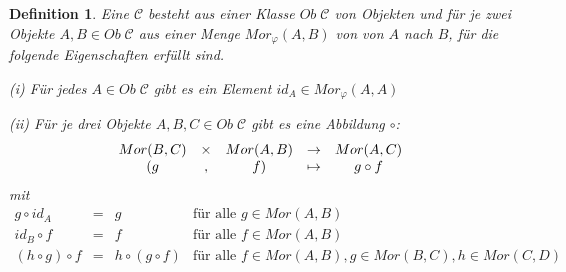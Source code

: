 \documentclass[a4paper,10pt,german]{scrbook}
\theoremstyle{saetze}
\theoremstyle{definitionen}
\newtheorem{Def}{Definition}[section]
\begin{document}
\begin{Def}
    Eine  $\mathcal{C}$ besteht aus einer Klasse $Ob
    \;\mathcal{C}$ von Objekten und für je zwei Objekte $A,B \in Ob\; \mathcal{C}$ aus 
    einer Menge $Mor_{\varphi}(A,B)$ von  von $A$ nach $B$, für
    die folgende Eigenschaften erfüllt sind.
    
    \begin{enum}
        \item[(i)] Für jedes $A \in Ob\; \mathcal{C}$ gibt es ein Element $id_A
        \in Mor_{\varphi}(A,A)$

        \item[(ii)] Für je drei Objekte $A,B,C \in Ob\;\mathcal{C}$ gibt es eine Abbildung
        $\circ$:
        \[\begin{array}{ccccc} Mor(B,C) & \times & Mor(A,B) & \rightarrow & Mor(A,C) \\
        (g  &,& f)  & \mapsto & g \circ f \end{array}\] mit 
        \[\begin{array}{cccc} g \circ id_A & = & g & \mbox{für alle } g \in
        Mor(A,B) \\ id_B \circ f &=& f & \mbox{für alle } f \in Mor(A,B) \\ (h
        \circ g)\circ f & = & h\circ(g\circ f) & \mbox{für alle } f \in
        Mor(A,B), g \in Mor(B,C), h \in Mor(C,D)\end{array}\]
\end{enum}


\end{Def}
\end{document}
